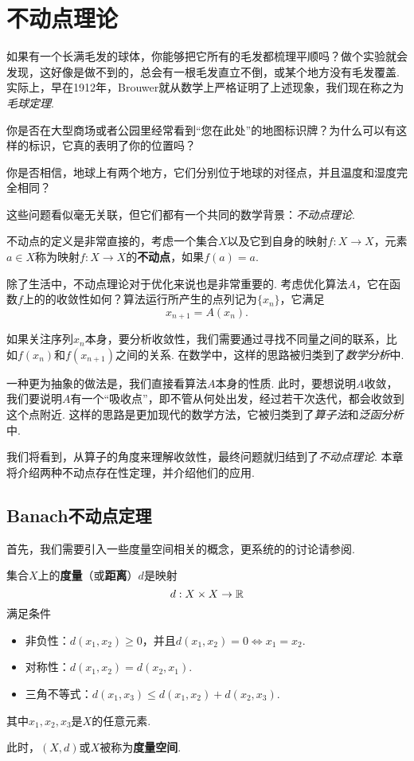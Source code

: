 \chapter{不动点理论}\label{chap:fixed-point-theory}

如果有一个长满毛发的球体，你能够把它所有的毛发都梳理平顺吗？做个实验就会发现，这好像是做不到的，总会有一根毛发直立不倒，或某个地方没有毛发覆盖. 实际上，早在1912年，Brouwer就从数学上严格证明了上述现象，我们现在称之为\textit{毛球定理}.

你是否在大型商场或者公园里经常看到“您在此处”的地图标识牌？为什么可以有这样的标识，它真的表明了你的位置吗？

你是否相信，地球上有两个地方，它们分别位于地球的对径点，并且温度和湿度完全相同？

这些问题看似毫无关联，但它们都有一个共同的数学背景：\textit{不动点理论}.

不动点的定义是非常直接的，考虑一个集合$X$以及它到自身的映射$f:X\to X$，元素$a\in X$称为映射$f:X\to X$的\textbf{不动点}，如果$f(a)=a$. 

除了生活中，不动点理论对于优化来说也是非常重要的. 考虑优化算法$A$，它在函数$f$上的的收敛性如何？算法运行所产生的点列记为$\{x_n\}$，它满足
\[x_{n+1}=A(x_n).\] 

如果关注序列$x_n$本身，要分析收敛性，我们需要通过寻找不同量之间的联系，比如$f(x_n)$和$f(x_{n+1})$之间的关系. 在数学中，这样的思路被归类到了\textit{数学分析}中.  

一种更为抽象的做法是，我们直接看算法$A$本身的性质. 此时，要想说明$A$收敛，我们要说明$A$有一个“吸收点”，即不管从何处出发，经过若干次迭代，都会收敛到这个点附近. 这样的思路是更加现代的数学方法，它被归类到了\textit{算子法}和\textit{泛函分析}中. 

我们将看到，从算子的角度来理解收敛性，最终问题就归结到了\textit{不动点理论}. 本章将介绍两种不动点存在性定理，并介绍他们的应用.

\section{Banach不动点定理}

首先，我们需要引入一些度量空间相关的概念，更系统的的讨论请参阅.

\begin{definition}[度量与度量空间]
集合$X$上的\textbf{度量}（或\textbf{距离}）$d$是映射
\[d:X\times X\to \mathbb{R}\]
满足条件
\begin{itemize}
\item 非负性：$d(x_1,x_2)\geq 0$，并且$d(x_1,x_2)=0\iff x_1=x_2$.
\item 对称性：$d(x_1,x_2)=d(x_2,x_1)$.
\item 三角不等式：$d(x_1,x_3)\leq d(x_1,x_2)+d(x_2,x_3)$.
\end{itemize}
其中$x_1,x_2,x_3$是$X$的任意元素. 

此时，$(X,d)$或$X$被称为\textbf{度量空间}.
\end{definition}

